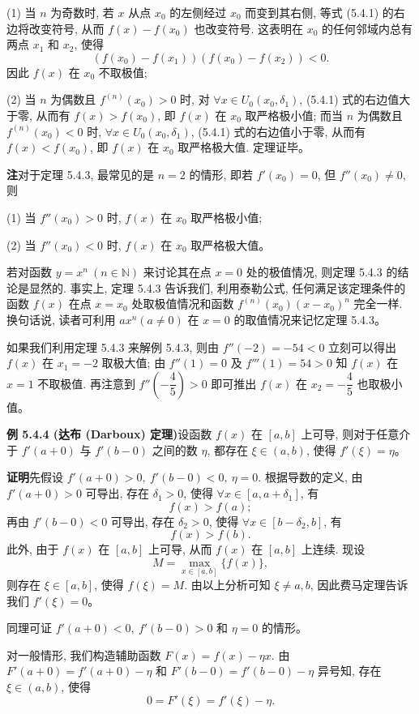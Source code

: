 \documentclass[UTF8, 12pt, fontset=fandol, oneside]{ctexart}
\begin{document}
(1) 当 $n$ 为奇数时, 若 $x$ 从点 $x_0$ 的左侧经过 $x_0$ 而变到其右侧, 等式 (5.4.1) 的右边将改变符号, 从而 $f(x)-f(x_0)$ 也改变符号. 这表明在 $x_0$ 的任何邻域内总有两点 $x_1$ 和 $x_2$, 使得
\[
  (f(x_0)-f(x_1))(f(x_0)-f(x_2))<0.
\]
因此 $f(x)$ 在 $x_0$ 不取极值;

(2) 当 $n$ 为偶数且 $f^{(n)}(x_0)>0$ 时, 对 $\forall x\in U_0(x_0,\delta_1)$, (5.4.1) 式的右边值大于零, 从而有 $f(x)>f(x_0)$, 即 $f(x)$ 在 $x_0$ 取严格极小值; 而当 $n$ 为偶数且 $f^{(n)}(x_0)<0$ 时, $\forall x\in U_0(x_0,\delta_1)$, (5.4.1) 式的右边值小于零, 从而有 $f(x)<f(x_0)$, 即 $f(x)$ 在 $x_0$ 取严格极大值. 定理证毕。

\noindent\textbf{注}\quad 对于定理 5.4.3, 最常见的是 $n=2$ 的情形, 即若 $f'(x_0)=0$, 但 $f''(x_0)\ne0$, 则

(1) 当 $f''(x_0)>0$ 时, $f(x)$ 在 $x_0$ 取严格极小值;

(2) 当 $f''(x_0)<0$ 时, $f(x)$ 在 $x_0$ 取严格极大值。

若对函数 $y=x^n\ (n\in\mathbb{N})$ 来讨论其在点 $x=0$ 处的极值情况, 则定理 5.4.3 的结论是显然的. 事实上, 定理 5.4.3 告诉我们, 利用泰勒公式, 任何满足该定理条件的函数 $f(x)$ 在点 $x=x_0$ 处取极值情况和函数 $f^{(n)}(x_0)(x-x_0)^n$ 完全一样. 换句话说, 读者可利用 $ax^n(a\ne0)$ 在 $x=0$ 的取值情况来记忆定理 5.4.3。

如果我们利用定理 5.4.3 来解例 5.4.3, 则由 $f''(-2)=-54<0$ 立刻可以得出 $f(x)$ 在 $x_1=-2$ 取极大值; 由 $f''(1)=0$ 及 $f'''(1)=54>0$ 知 $f(x)$ 在 $x=1$ 不取极值. 再注意到 $f''\left(-\dfrac45\right)>0$ 即可推出 $f(x)$ 在 $x_2=-\dfrac45$ 也取极小值。

\noindent\textbf{例 5.4.4 (达布 (Darboux) 定理)}\quad 设函数 $f(x)$ 在 $[a,b]$ 上可导, 则对于任意介于 $f'(a+0)$ 与 $f'(b-0)$ 之间的数 $\eta$, 都存在 $\xi\in(a,b)$, 使得 $f'(\xi)=\eta$。

\noindent\textbf{证明}\quad 先假设 $f'(a+0)>0,\ f'(b-0)<0,\ \eta=0$. 根据导数的定义, 由 $f'(a+0)>0$ 可导出, 存在 $\delta_1>0$, 使得 $\forall x\in[a,a+\delta_1]$, 有
\[
  f(x)>f(a);
\]
再由 $f'(b-0)<0$ 可导出, 存在 $\delta_2>0$, 使得 $\forall x\in[b-\delta_2,b]$, 有
\[
  f(x)>f(b).
\]
此外, 由于 $f(x)$ 在 $[a,b]$ 上可导, 从而 $f(x)$ 在 $[a,b]$ 上连续. 现设
\[
  M=\max_{x\in[a,b]}\{f(x)\},
\]
则存在 $\xi\in[a,b]$, 使得 $f(\xi)=M$. 由以上分析可知 $\xi\ne a,b$, 因此费马定理告诉我们 $f'(\xi)=0$。

同理可证 $f'(a+0)<0,\ f'(b-0)>0$ 和 $\eta=0$ 的情形。

对一般情形, 我们构造辅助函数 $F(x)=f(x)-\eta x$. 由 $F'(a+0)=f'(a+0)-\eta$ 和 $F'(b-0)=f'(b-0)-\eta$ 异号知, 存在 $\xi\in(a,b)$, 使得
\[
  0=F'(\xi)=f'(\xi)-\eta.
\]
\end{document}
